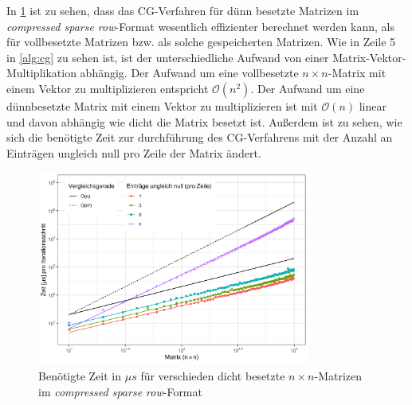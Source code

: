 \documentclass[12pt,a4paper]{scrartcl}
\numberwithin{equation}{section}
\numberwithin{myalgctr}{section}
\numberwithin{mytheoremctr}{subsection}
\numberwithin{mykorollarctr}{subsection}
\numberwithin{mylemmactr}{subsection}
\numberwithin{mybeispielctr}{subsection}
\begin{document}
	 
	
	 
	
	

	In \cref{fig:zeitcg-sparse} ist zu sehen, dass das CG-Verfahren f\"ur d\"unn besetzte Matrizen im \textit{compressed sparse row}-Format wesentlich effizienter berechnet werden kann, als f\"ur vollbesetzte Matrizen bzw. als solche gespeicherten Matrizen.
	Wie in Zeile 5 in \cref{alg:cg} zu sehen ist, ist der unterschiedliche Aufwand von einer Matrix-Vektor-Multiplikation abh\"angig. Der Aufwand um eine vollbesetzte $n\times n$-Matrix mit einem Vektor zu multiplizieren entspricht $\mathcal{O}(n^2)$. Der Aufwand um eine d\"unnbesetzte Matrix mit einem Vektor zu multiplizieren ist mit $\mathcal{O}(n)$ linear und davon abh\"angig wie dicht die Matrix besetzt ist. Außerdem ist zu sehen, wie sich die ben\"otigte Zeit zur durchf\"uhrung des CG-Verfahrens mit der Anzahl an Eintr\"agen ungleich null pro Zeile der Matrix \"andert.
	
	\begin{figure}[H]
		\begin{center}
			\includegraphics[width=0.8\textwidth]{../plots/cg-sparsity-sparse.png}
		\end{center}
		\caption{Ben\"otigte Zeit in $\mu s$ f\"ur verschieden dicht besetzte $n\times n$-Matrizen im \textit{compressed sparse row}-Format}
		\label{fig:zeitcg-sparse}	
	\end{figure}
	
\end{document}

